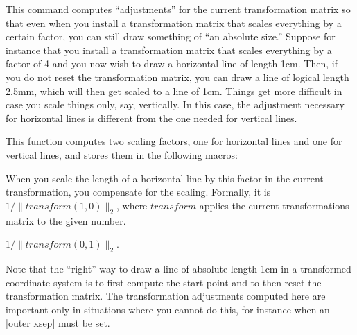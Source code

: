 \begin{command}{\pgftransformationadjustments}
    This command computes ``adjustments'' for the current transformation matrix
    so that even when you install a transformation matrix that scales
    everything by a certain factor, you can still draw something of ``an
    absolute size.'' Suppose for instance that you install a transformation
    matrix that scales everything by a factor of 4 and you now wish to draw a
    horizontal line of length 1cm. Then, if you do not reset the transformation
    matrix, you can draw a line of logical length 2.5mm, which will then get
    scaled to a line of 1cm. Things get more difficult in case you scale things
    only, say, vertically. In this case, the adjustment necessary for
    horizontal lines is different from the one needed for vertical lines.

    This function computes two scaling factors, one for horizontal lines
    and one for vertical lines, and stores them in the following macros:
    \begin{command}{\pgfhorizontaltransformationadjustment}
        When you scale the length of a horizontal line by this factor in the
        current transformation, you compensate for the scaling. Formally, it is
        $1/\|\mathit{transform}(1,0)\|_2$, where $\mathit{transform}$ applies
        the current transformations matrix to the given number.
\begin{codeexample}[]
\end{codeexample}
\begin{codeexample}[]
\end{codeexample}
    \end{command}
    \begin{command}{\pgfverticaltransformationadjustment}
        $1/\|\mathit{transform}(0,1)\|_2$.
    \end{command}

    Note that the ``right'' way to draw a line of absolute length 1cm in a
    transformed coordinate system is to first compute the start point and to
    then reset the transformation matrix. The transformation adjustments
    computed here are important only in situations where you cannot do this,
    for instance when an |outer xsep| must be set.
\end{command}


